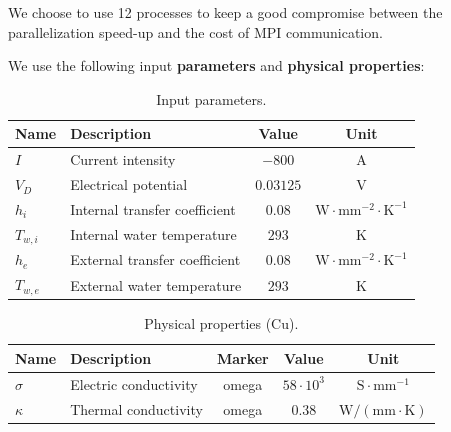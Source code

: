 \documentclass[12pt]{article}
\begin{document}
We choose to use 12 processes to keep a good compromise between the parallelization 
speed-up and the cost of MPI communication.

We use the following input \textbf{parameters} and \textbf{physical properties}:

\begin{table}[H]
  \centering
  \begin{tabular}{|l|l|c|c|}
    \hline
    \textbf{Name} & \textbf{Description} & \textbf{Value} & \textbf{Unit} \\ \hline
    $I$ & Current intensity & $-800$ & A \\ \hline
    $V_D$ & Electrical potential & $0.03125$ & V \\ \hline
    $h_i$ & Internal transfer coefficient & $0.08$ & $\mathrm{W \cdot mm^{-2} \cdot K^{-1}}$ \\ \hline
    $T_{w,i}$ & Internal water temperature & $293$ & K \\ \hline
    $h_e$ & External transfer coefficient & $0.08$ & $\mathrm{W \cdot mm^{-2} \cdot K^{-1}}$ \\ \hline
    $T_{w,e}$ & External water temperature & $293$ & K \\ \hline
  \end{tabular}
  \caption{Input parameters.}
  \label{tab:input_parameters}
\end{table}

\begin{table}[H]
  \centering
  \begin{tabular}{|l|l|c|c|c|}
    \hline
    \textbf{Name} & \textbf{Description} & \textbf{Marker} & \textbf{Value} & \textbf{Unit} \\ \hline
    $\sigma$ & Electric conductivity & omega & $58 \cdot 10^3$ & $\mathrm{S \cdot mm^{-1}}$ \\ \hline
    $\kappa$ & Thermal conductivity & omega & $0.38$ & $\mathrm{W/(mm \cdot K)}$ \\ \hline
  \end{tabular}
  \caption{Physical properties (Cu).}
  \label{tab:physical_properties}
\end{table}
\end{document}
